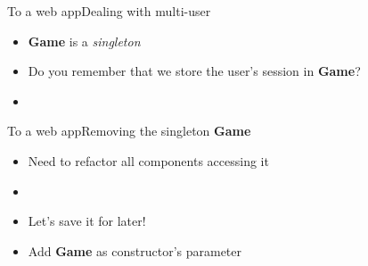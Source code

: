 \documentclass{beamer}
\begin{document}
\begin{frame}{To a web app}{Dealing with multi-user}
  \begin{itemize}
  \item {
    \textbf{Game} is a \emph{singleton}
    \pause
  }
  \item {
    Do you remember that we store the user's session in \textbf{Game}?
  }
  \item[~] {
    \begin{center}
    \end{center}
  }
  \end{itemize}
\end{frame}

\begin{frame}{To a web app}{Removing the singleton \textbf{Game}}
  \begin{itemize}
  \item {
    Need to refactor all components accessing it
    \pause
  }
  \item[~]
  \item {Let's save it for later!}
  \item {Add \textbf{Game} as constructor's parameter}
  \end{itemize}
\end{frame}
\end{document}
